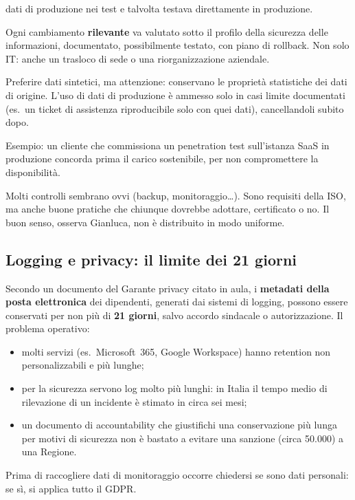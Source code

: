 \begin{description}
    dati di produzione nei test e talvolta testava direttamente in produzione.
  \item[8.32 Change management.] Ogni cambiamento \textbf{rilevante} va valutato sotto il profilo della
    sicurezza delle informazioni, documentato, possibilmente testato, con piano di rollback. Non solo IT:
    anche un trasloco di sede o una riorganizzazione aziendale.
  \item[8.33 Dati di test.] Preferire dati sintetici, ma attenzione: conservano le proprietà statistiche
    dei dati di origine. L'uso di dati di produzione è ammesso solo in casi limite documentati (es.\ un
    ticket di assistenza riproducibile solo con quei dati), cancellandoli subito dopo.
  \item[8.34 Protezione durante audit e test.] Esempio: un cliente che commissiona un penetration test
    sull'istanza SaaS in produzione concorda prima il carico sostenibile, per non compromettere la
    disponibilità.
\end{description}

\begin{nota}
Molti controlli sembrano ovvi (backup, monitoraggio\ldots). Sono requisiti della ISO, ma anche buone
pratiche che chiunque dovrebbe adottare, certificato o no. Il buon senso, osserva Gianluca, non è
distribuito in modo uniforme.
\end{nota}

\subsection{Logging e privacy: il limite dei 21 giorni}
Secondo un documento del Garante privacy citato in aula, i \textbf{metadati della posta elettronica} dei
dipendenti, generati dai sistemi di logging, possono essere conservati per non più di \textbf{21 giorni},
salvo accordo sindacale o autorizzazione. Il problema operativo:
\begin{itemize}
  \item molti servizi (es.\ Microsoft~365, Google Workspace) hanno retention non personalizzabili e più
    lunghe;
  \item per la sicurezza servono log molto più lunghi: in Italia il tempo medio di rilevazione di un
    incidente è stimato in circa sei mesi;
  \item un documento di accountability che giustifichi una conservazione più lunga per motivi di
    sicurezza non è bastato a evitare una sanzione (circa \texteuro{}50.000) a una Regione.
\end{itemize}
Prima di raccogliere dati di monitoraggio occorre chiedersi se sono dati personali: se sì, si applica
tutto il GDPR.


